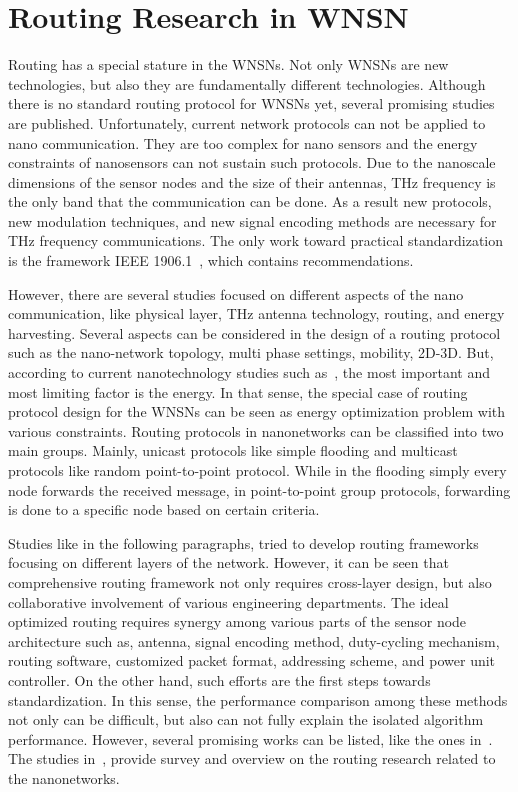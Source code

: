 \documentclass[12pt, oneandhalf, chaparabic, sees, ms]{metu}
\begin{document}
\newpage
\section{Routing Research in WNSN}\label{sroutingWNSN}


Routing has a special stature in the WNSNs. Not only WNSNs are new technologies, but also they are fundamentally different technologies.
Although there is no standard routing protocol for WNSNs yet, several promising studies are published.
Unfortunately, current network protocols can not be applied to nano communication. They are too complex for nano sensors and the energy constraints of
nanosensors can not sustain such protocols. Due to the nanoscale dimensions of the sensor nodes and the size of their antennas, 
THz frequency is the only band that the communication can be done.
As a result new protocols, new modulation techniques, and new signal encoding methods are necessary for THz frequency communications. 
The only work toward practical standardization is the framework IEEE 1906.1~\cite{ieee-1906}, which contains recommendations.

However, there are several studies focused on different aspects of the nano communication, like physical layer, THz antenna technology, routing, 
and energy harvesting.
Several aspects can be considered in the design of a routing protocol such as the nano-network topology, multi phase settings, mobility, 2D-3D.
But, according to current nanotechnology studies such as~\cite{akyildiz2010-2, pierobon2014}, the most important and most limiting factor is the energy.
In that sense, the special case of routing protocol design for the WNSNs can be seen as energy optimization problem with various constraints.
Routing protocols in nanonetworks can be classified into two main groups. Mainly, unicast protocols like simple flooding and multicast protocols like random point-to-point protocol. 
While in the flooding simply every node forwards the received message, in point-to-point group protocols, 
forwarding is done to a specific node based on certain criteria.

Studies like in the following paragraphs, tried to develop routing frameworks focusing on different layers of the network. However, it can be seen 
that comprehensive routing framework not only requires cross-layer design, but also collaborative involvement of various engineering departments.
The ideal optimized routing requires synergy among various parts of the sensor node architecture such as, antenna, signal encoding method, duty-cycling mechanism, 
routing software, customized packet format, addressing scheme, and power unit controller. On the other hand, such efforts are the first steps towards standardization.
In this sense, the performance comparison among these methods not only can be difficult, but also can not fully explain the isolated algorithm performance.
However, several promising works can be listed, like the ones in~\cite{zhou2012, yu2015, liaskos2015, liaskos2016, afsana2018}. 
The studies in~\cite{tairin2017, abuali2018}, provide survey and overview on the routing research 
related to the nanonetworks.
\end{document}
